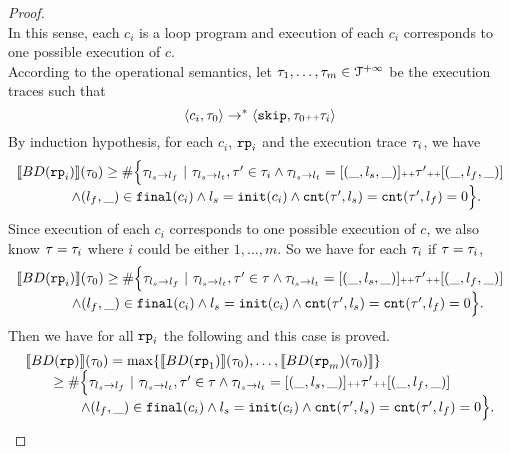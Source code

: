\begin{proof}
\\
In this sense, each $c_i$ is a loop program and execution of each $c_i$ corresponds to one possible execution of $c$.
\\
According to the operational semantics, let $\mathtt{\tau}_1, \ldots, \mathtt{\tau}_m \in \mathcal{T}^{+\infty}$ be the execution traces such that 
\[
  \langle c_i, \mathtt{\tau}_0 \rangle \to^* 
  \langle \mathtt{skip}, \mathtt{\tau}_0 {\scriptscriptstyle ++} \mathtt{\tau}_i \rangle
\]
By induction hypothesis, for each $c_i$, $\mathtt{rp}_i$ and the execution trace $\mathtt{\tau}_i$, we have 
\[
  \begin{array}{l}
  \llbracket BD(\mathtt{rp}_i) \rrbracket(\mathtt{\tau}_0) \geq
  \# \Big\{\mathtt{\tau}_{l_s \to l_f} ~\vert~ \mathtt{\tau}_{l_s \to l_t}, \mathtt{\tau}' \in \mathtt{\tau}_i \land \mathtt{\tau}_{l_s \to l_t} = [(\_, l_s, \_)] {\scriptscriptstyle ++} \mathtt{\tau}' {\scriptscriptstyle ++} [(\_, l_f, \_)]
  \\ \qquad \qquad
  \land (l_{f}, \_) \in \mathtt{final}(c_i)
  \land l_s = \mathtt{init}(c_i)
  \land \mathtt{cnt}(\mathtt{\tau}', l_s) = \mathtt{cnt}(\mathtt{\tau}', l_f) = 0 
  \Big\}.
  \end{array}
\]
Since execution of each $c_i$ corresponds to one possible execution of $c$, we also know
$\mathtt{\tau} = \mathtt{\tau}_i$ where $i$ could be either $1, \ldots, m$.
So we have for each $\mathtt{\tau}_i$ if $\mathtt{\tau} = \mathtt{\tau}_i$, 
\[
  \begin{array}{l}
    \llbracket BD(\mathtt{rp}_i) \rrbracket(\mathtt{\tau}_0) \geq
    \# \Big\{\mathtt{\tau}_{l_s \to l_f} ~\vert~ \mathtt{\tau}_{l_s \to l_t}, \mathtt{\tau}' \in \mathtt{\tau} \land \mathtt{\tau}_{l_s \to l_t} = [(\_, l_s, \_)] {\scriptscriptstyle ++} \mathtt{\tau}' {\scriptscriptstyle ++} [(\_, l_f, \_)]
    \\ \qquad \qquad
    \land (l_{f}, \_) \in \mathtt{final}(c_i)
    \land l_s = \mathtt{init}(c_i)
    \land \mathtt{cnt}(\mathtt{\tau}', l_s) = \mathtt{cnt}(\mathtt{\tau}', l_f) = 0 
    \Big\}.
    \end{array}
\]
Then we have for all $\mathtt{rp}_i$ the following and this case is proved.
\[
  \begin{array}{l}
    \econfig{BD(\rprog)}(\trace_0) = 
    \max\left\{ \econfig{BD(\rprog_1)}(\trace_0), \ldots, \econfig{BD(\rprog_m)(\trace_0)} \right\}
    \\ \qquad 
    \geq
    \# \Big\{\trace_{l_s \to l_f} ~\vert~ \trace_{l_s \to l_t}, \trace' \in \trace \land \trace_{l_s \to l_t} = [(\_, l_s, \_)] \tracecat \trace' \tracecat [(\_, l_f, \_)]
    \\ \qquad \qquad
    \land (l_{f}, \_) \in \absfinal(c_i)
    \land l_s = \absinit(c_i)
    \land \counter(\trace', l_s) = \counter(\trace', l_f) = 0 
    \Big\}.
    \end{array}
\]


\end{proof}
